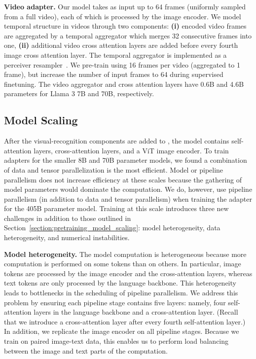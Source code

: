 \documentclass[dvipsnames]{fairmeta}
\begin{document}
\textbf{Video adapter.} Our model takes as input up to 64 frames (uniformly sampled from a full video), each of which is processed by the image encoder.
We model temporal structure in videos through two components: \textbf{(i)} encoded video frames are aggregated by a temporal aggregator which merges 32 consecutive frames into one, \textbf{(ii)} additional video cross attention layers are added before every fourth image cross attention layer.
The temporal aggregator is implemented as a perceiver resampler~\citep{jaegle2021perceiver,alayrac2022flamingo}.
We pre-train using 16 frames per video (aggregated to 1 frame), but increase the number of input frames to 64 during supervised finetuning.
The video aggregator and cross attention layers have 0.6B and 4.6B parameters for Llama 3 7B and 70B, respectively. 

\subsection{Model Scaling}
\label{section:vision_model_scaling}

After the visual-recognition components are added to \llamathree, the model contains self-attention layers, cross-attention layers, and a ViT image encoder.
To train adapters for the smaller 8B and 70B parameter models, we found a combination of data and tensor parallelization is the most efficient.
Model or pipeline parallelism does not increase efficiency at these scales because the gathering of model parameters would dominate the computation.
We do, however, use pipeline parallelism (in addition to data and tensor parallelism) when training the adapter for the 405B parameter model.
Training at this scale introduces three new challenges in addition to those outlined in Section~\ref{section:pretraining_model_scaling}: model heterogeneity, data heterogeneity, and numerical instabilities.

\textbf{Model heterogeneity.} The model computation is heterogeneous because more computation is performed on some tokens than on others.
In particular, image tokens are processed by the image encoder and the cross-attention layers, whereas text tokens are only processed by the language backbone.
This heterogeneity leads to bottlenecks in the scheduling of pipeline parallelism.
We address this problem by ensuring each pipeline stage contains five layers: namely, four self-attention layers in the language backbone and a cross-attention layer.
(Recall that we introduce a cross-attention layer after every fourth self-attention layer.)
In addition, we replicate the image encoder on all pipeline stages.
Because we train on paired image-text data, this enables us to perform load balancing between the image and text parts of the computation.
\end{document}
